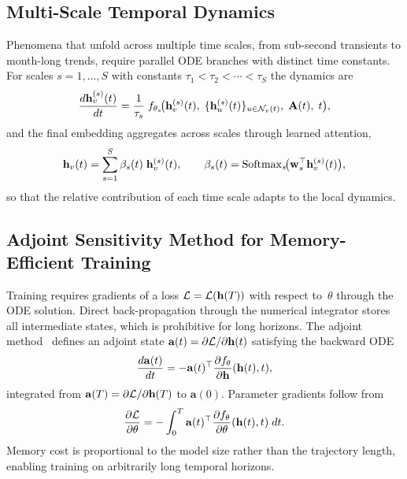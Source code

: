 \subsection{Multi-Scale Temporal Dynamics}

Phenomena that unfold across multiple time scales, from sub-second transients to month-long trends, require parallel ODE branches with distinct time constants. For scales $s=1,\dots,S$ with constants $\tau_1<\tau_2<\cdots<\tau_S$ the dynamics are
\begin{equation}
\frac{d\mathbf{h}_v^{(s)}(t)}{dt}
= \frac{1}{\tau_s}\;f_{\theta_s}\!\bigl(
  \mathbf{h}_v^{(s)}(t),\;\{\mathbf{h}_u^{(s)}(t)\}_{u\in\mathcal{N}_v(t)},\;
  \mathbf{A}(t),\;t\bigr),
\label{eq:ct_tgnn_multi}
\end{equation}and the final embedding aggregates across scales through learned attention,\begin{equation}
\mathbf{h}_v(t)
= \sum_{s=1}^{S}\beta_s(t)\;\mathbf{h}_v^{(s)}(t),
\qquad
\beta_s(t) = \mathrm{Softmax}_s\!\bigl(\mathbf{w}_s^\top\mathbf{h}_v^{(s)}(t)\bigr),
\label{eq:ct_tgnn_scale_fuse}
\end{equation}so that the relative contribution of each time scale adapts to the local dynamics.

\subsection{Adjoint Sensitivity Method for Memory-Efficient Training}

Training requires gradients of a loss $\mathcal{L}=\mathcal{L}(\mathbf{h}(T))$ with respect to~$\theta$ through the ODE solution. Direct back-propagation through the numerical integrator stores all intermediate states, which is prohibitive for long horizons. The adjoint method~\cite{Pontryagin1962,Chen2018} defines an adjoint state $\mathbf{a}(t)=\partial\mathcal{L}/\partial\mathbf{h}(t)$ satisfying the backward ODE
\begin{equation}
\frac{d\mathbf{a}(t)}{dt}
= -\mathbf{a}(t)^\top\frac{\partial f_\theta}{\partial\mathbf{h}}(\mathbf{h}(t),t),
\label{eq:adjoint_ode}
\end{equation}
integrated from $\mathbf{a}(T)=\partial\mathcal{L}/\partial\mathbf{h}(T)$ to $\mathbf{a}(0)$. Parameter gradients follow from
\begin{equation}
\frac{\partial\mathcal{L}}{\partial\theta}
= -\int_0^T \mathbf{a}(t)^\top
  \frac{\partial f_\theta}{\partial\theta}(\mathbf{h}(t),t)\;dt.
\label{eq:adjoint_param}
\end{equation}Memory cost is proportional to the model size rather than the trajectory length, enabling training on arbitrarily long temporal horizons.

